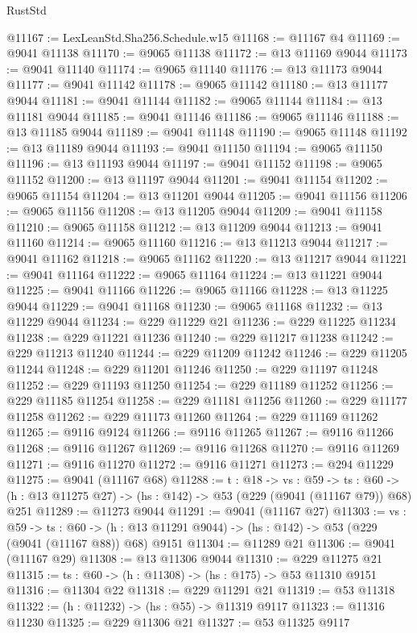 \begin{lexlean}{RustStd}
\begin{coremodule}
@11167 := LexLeanStd.Sha256.Schedule.w15
@11168 := @11167 @4
@11169 := @9041 @11138
@11170 := @9065 @11138
@11172 := @13 @11169 @9044
@11173 := @9041 @11140
@11174 := @9065 @11140
@11176 := @13 @11173 @9044
@11177 := @9041 @11142
@11178 := @9065 @11142
@11180 := @13 @11177 @9044
@11181 := @9041 @11144
@11182 := @9065 @11144
@11184 := @13 @11181 @9044
@11185 := @9041 @11146
@11186 := @9065 @11146
@11188 := @13 @11185 @9044
@11189 := @9041 @11148
@11190 := @9065 @11148
@11192 := @13 @11189 @9044
@11193 := @9041 @11150
@11194 := @9065 @11150
@11196 := @13 @11193 @9044
@11197 := @9041 @11152
@11198 := @9065 @11152
@11200 := @13 @11197 @9044
@11201 := @9041 @11154
@11202 := @9065 @11154
@11204 := @13 @11201 @9044
@11205 := @9041 @11156
@11206 := @9065 @11156
@11208 := @13 @11205 @9044
@11209 := @9041 @11158
@11210 := @9065 @11158
@11212 := @13 @11209 @9044
@11213 := @9041 @11160
@11214 := @9065 @11160
@11216 := @13 @11213 @9044
@11217 := @9041 @11162
@11218 := @9065 @11162
@11220 := @13 @11217 @9044
@11221 := @9041 @11164
@11222 := @9065 @11164
@11224 := @13 @11221 @9044
@11225 := @9041 @11166
@11226 := @9065 @11166
@11228 := @13 @11225 @9044
@11229 := @9041 @11168
@11230 := @9065 @11168
@11232 := @13 @11229 @9044
@11234 := @229 @11229 @21
@11236 := @229 @11225 @11234
@11238 := @229 @11221 @11236
@11240 := @229 @11217 @11238
@11242 := @229 @11213 @11240
@11244 := @229 @11209 @11242
@11246 := @229 @11205 @11244
@11248 := @229 @11201 @11246
@11250 := @229 @11197 @11248
@11252 := @229 @11193 @11250
@11254 := @229 @11189 @11252
@11256 := @229 @11185 @11254
@11258 := @229 @11181 @11256
@11260 := @229 @11177 @11258
@11262 := @229 @11173 @11260
@11264 := @229 @11169 @11262
@11265 := @9116 @9124
@11266 := @9116 @11265
@11267 := @9116 @11266
@11268 := @9116 @11267
@11269 := @9116 @11268
@11270 := @9116 @11269
@11271 := @9116 @11270
@11272 := @9116 @11271
@11273 := @294 @11229
@11275 := @9041 (@11167 @68)
@11288 := {t : @18} ->
  {vs : @59} ->
  {ts : @60} -> (h : @13 @11275 @27) -> (hs : @142) -> @53 (@229 (@9041 (@11167 @79)) @68) @251
@11289 := @11273 @9044
@11291 := @9041 (@11167 @27)
@11303 := {vs : @59} ->
  {ts : @60} -> (h : @13 @11291 @9044) -> (hs : @142) -> @53 (@229 (@9041 (@11167 @88)) @68) @9151
@11304 := @11289 @21
@11306 := @9041 (@11167 @29)
@11308 := @13 @11306 @9044
@11310 := @229 @11275 @21
@11315 := {ts : @60} -> (h : @11308) -> (hs : @175) -> @53 @11310 @9151
@11316 := @11304 @22
@11318 := @229 @11291 @21
@11319 := @53 @11318
@11322 := (h : @11232) -> (hs : @55) -> @11319 @9117
@11323 := @11316 @11230
@11325 := @229 @11306 @21
@11327 := @53 @11325 @9117

\end{coremodule}
\end{lexlean}
